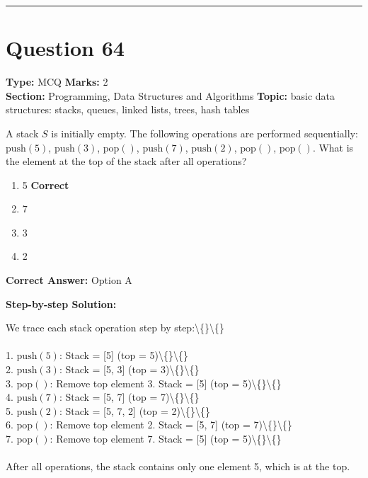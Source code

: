 \documentclass[11pt]{article}
\begin{document}
\vspace{0.8em}
\hrule
\vspace{0.4em}
\section*{Question 64}
\textbf{Type:} MCQ \hfill \textbf{Marks:} 2\\
\textbf{Section:} Programming, Data Structures and Algorithms \hfill \textbf{Topic:} basic data structures: stacks, queues, linked lists, trees, hash tables

A stack \(S\) is initially empty. The following operations are performed sequentially: \(\text{push}(5)\), \(\text{push}(3)\), \(\text{pop}()\), \(\text{push}(7)\), \(\text{push}(2)\), \(\text{pop}()\), \(\text{pop}()\). What is the element at the top of the stack after all operations?


\begin{enumerate}[label=\textbf{\Alph*.}, leftmargin=1.8em]
\item 5 \hfill {\color{gategreen}\textbf{Correct}}\item 7\item 3\item 2\end{enumerate}

\textbf{Correct Answer:} Option A

\textbf{Step-by-step Solution:}

We trace each stack operation step by step:\textbackslash\{\}\textbackslash\{\}\\
\\
1. \(\text{push}(5)\): Stack = [5] (top = 5)\textbackslash\{\}\textbackslash\{\}\\
2. \(\text{push}(3)\): Stack = [5, 3] (top = 3)\textbackslash\{\}\textbackslash\{\}\\
3. \(\text{pop}()\): Remove top element 3. Stack = [5] (top = 5)\textbackslash\{\}\textbackslash\{\}\\
4. \(\text{push}(7)\): Stack = [5, 7] (top = 7)\textbackslash\{\}\textbackslash\{\}\\
5. \(\text{push}(2)\): Stack = [5, 7, 2] (top = 2)\textbackslash\{\}\textbackslash\{\}\\
6. \(\text{pop}()\): Remove top element 2. Stack = [5, 7] (top = 7)\textbackslash\{\}\textbackslash\{\}\\
7. \(\text{pop}()\): Remove top element 7. Stack = [5] (top = 5)\textbackslash\{\}\textbackslash\{\}\\
\\
After all operations, the stack contains only one element 5, which is at the top.
\end{document}
